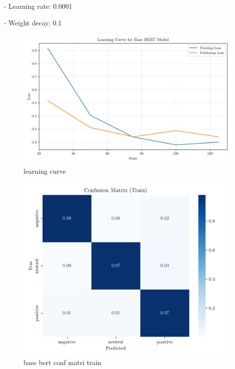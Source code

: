 \documentclass[conference]{IEEEtran}
\begin{document}
- Learning rate: 0.0001

- Weight decay: 0.1

\begin{figure}[H]
    \centering
    \includegraphics[width=1\linewidth]{assets/base_bert_learning_curve.png}
    \caption{learning curve}
    \label{fig:base_bert_learning_curve}
\end{figure}

\begin{figure}[H]
    \centering
    \includegraphics[width=1\linewidth]{assets/base_bert_confusion_matrix_Train.png}
    \caption{base bert conf matri train}
    \label{fig:base_bert_confusion_matrix_Train}
\end{figure}
\end{document}
